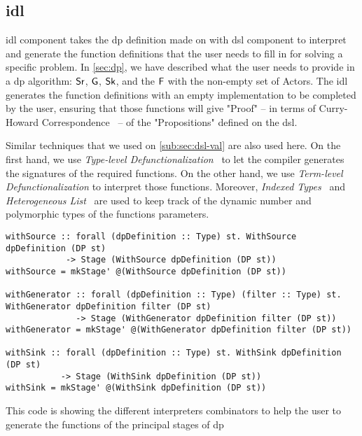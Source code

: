 \subsection{\acrfull{idl}}
\acrshort{idl} component takes the \acrshort{dp} definition made on with \acrshort{dsl} component to interpret and generate the function definitions
that the user needs to fill in for solving a specific problem. In \autoref{sec:dp}, we have described what the user needs to provide in a \acrshort{dp} algorithm: $\mathsf{Sr}$, $\mathsf{G}$, $\mathsf{Sk}$, and the $\mathsf{F}$ with the non-empty set of Actors.
The \acrshort{idl} generates the function definitions with an empty implementation to be completed by the user, ensuring that those functions will give "Proof" -- in terms of Curry-Howard Correspondence~\cite{curryhoward} --  of the "Propositions" defined on the \acrshort{dsl}.

Similar techniques that we used on \autoref{sub:sec:dsl-val} are also used here. 
On the first hand, we use \emph{Type-level Defunctionalization}~\cite{defunctionalization, fun-type-function-haskell} to let the compiler generates the signatures of the required functions. 
On the other hand, we use \emph{Term-level Defunctionalization} to interpret those functions.
Moreover, \emph{Indexed Types}~\cite{type-index} and \emph{Heterogeneous List}~\cite{hlist} are used to keep track of the dynamic number and polymorphic types of the functions parameters. 

\begin{listing}[H]
  \begin{verbatim}
withSource :: forall (dpDefinition :: Type) st. WithSource dpDefinition (DP st) 
            -> Stage (WithSource dpDefinition (DP st))
withSource = mkStage' @(WithSource dpDefinition (DP st))

withGenerator :: forall (dpDefinition :: Type) (filter :: Type) st. WithGenerator dpDefinition filter (DP st) 
              -> Stage (WithGenerator dpDefinition filter (DP st))
withGenerator = mkStage' @(WithGenerator dpDefinition filter (DP st))

withSink :: forall (dpDefinition :: Type) st. WithSink dpDefinition (DP st) 
           -> Stage (WithSink dpDefinition (DP st))
withSink = mkStage' @(WithSink dpDefinition (DP st))
  \end{verbatim}
  \caption[{[\texttt{Stage.hs}] Using with Interpreters of \acrshort{dp} encoded in $G_{dsl}$}]{This code is showing the different interpreters combinators to help the user to generate the functions of the principal stages of \acrshort{dp}}
  \label{src:dpfh:6}
\end{listing}

